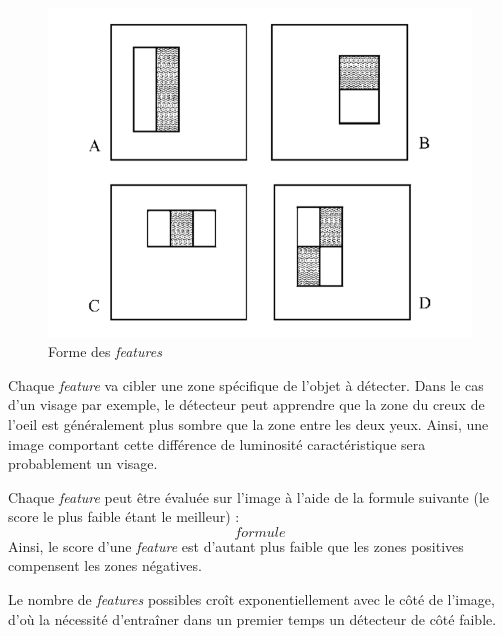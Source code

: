 \documentclass[12pt,a4paper]{article}
\begin{document}
\begin{figure}[t]
    \includegraphics[scale = 0.4]{forme_features}
    \centering
    \caption{Forme des \textit{features}}
\end{figure}

Chaque \textit{feature} va cibler une zone spécifique de l'objet à détecter. Dans le cas d'un visage par exemple, le détecteur peut apprendre que la zone du creux de l'oeil est généralement plus sombre que la zone entre les deux yeux. Ainsi, une image comportant cette différence de luminosité caractéristique sera probablement un visage.


Chaque \textit{feature} peut être évaluée sur l'image à l'aide de la formule suivante (le score le plus faible étant le meilleur) :
$$formule$$
Ainsi, le score d'une \textit{feature} est d'autant plus faible que les zones positives compensent les zones négatives. 


Le nombre de \textit{features} possibles croît exponentiellement avec le côté de l'image, d'où la nécessité d'entraîner dans un premier temps un détecteur de côté faible.
\end{document}
